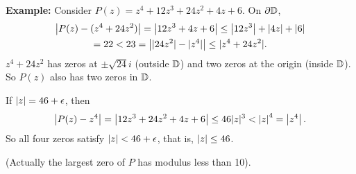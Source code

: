 \documentclass[10pt,aspectratio=169]{beamer}
\begin{document}
\begin{frame}
\textbf{Example:}
Consider $P(z) = z^4+12z^3+24z^2+4z+6$.
\pause
On $\partial {\mathbb{D}}$,
\begin{multline*}
\left\lvert {P(z)-(z^4+24z^2)} \right\rvert =
\left\lvert {12z^3+4z+6} \right\rvert \leq
\left\lvert {12z^3} \right\rvert+\left\lvert {4z} \right\rvert+\left\lvert {6} \right\rvert \\
= 22 < 23 = \left\lvert {\lvert {24 z^2} \rvert - \lvert {z^4} \rvert} \right\rvert
\leq \lvert {z^4+24z^2} \rvert .
\end{multline*}
\pause
$z^4+24z^2$ has zeros at $\pm \sqrt{24} i$ (outside ${\mathbb{D}}$)
and two zeros at the origin (inside ${\mathbb{D}}$).  So
$P(z)$ also has two zeros in ${\mathbb{D}}$.

\pause
\medskip

If $\lvert {z} \rvert = 46+\epsilon$, then
\[
\left\lvert {P(z)-z^4} \right\rvert = \left\lvert {12z^3+24z^2+4z+6} \right\rvert
\leq 46 \lvert {z} \rvert^3 < {\lvert {z} \rvert}^4 = \left\lvert {z^4} \right\rvert.
\]
\pause
So all four zeros satisfy $\lvert {z} \rvert < 46+\epsilon$, that is,
$\lvert {z} \rvert \leq 46$.

\pause
\medskip

(Actually the largest zero of $P$ has modulus less than 10).
\end{frame}
\end{document}
